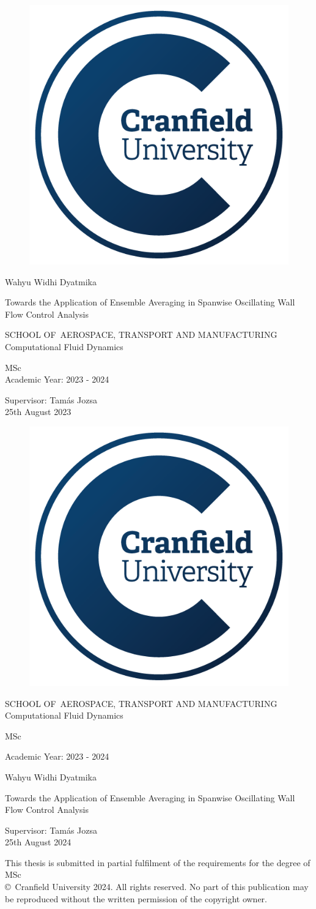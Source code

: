 {  \makeatletter
    \centering\Large\singlespacing%
    \pagestyle{empty}%
    \begin{figure}[H]
    \centering
    \includegraphics[width=0.3\linewidth]{Figures/CULogo.png}
    \label{fig:lOGO}
\end{figure}

    \par
    Wahyu Widhi Dyatmika\par
    \vfill
    Towards the Application of  Ensemble Averaging in Spanwise Oscillating Wall Flow Control Analysis\par
    \vfill%
    SCHOOL OF~\MakeUppercase{AEROSPACE, TRANSPORT AND
MANUFACTURING}\\%
    Computational Fluid Dynamics\par%
    \vfill
    MSc\\
     Academic Year: 2023 - 2024\par
   \vfill
   Supervisor: Tamás Jozsa\\%
   25th August 2023\par
    \vfill\null\cleardoublepage
    \centering\Large%
    \pagestyle{empty}
    \begin{figure}[H]
    \centering
    \includegraphics[width=0.3\linewidth]{Figures/CULogo.png}
    \label{fig:culogo}
\end{figure}
\par
    \vfill%
    SCHOOL OF~\MakeUppercase{AEROSPACE, TRANSPORT AND
MANUFACTURING}\\%
    Computational Fluid Dynamics\par%
    \vfill
    MSc\par%
    \vfill
    Academic Year: 2023 - 2024\par%
    \vfill
    Wahyu Widhi Dyatmika\par
    \vfill
    Towards the Application of  Ensemble Averaging in Spanwise Oscillating Wall Flow Control Analysis\par
    \vfill
    Supervisor: Tamás Jozsa\\
     25th August 2024\par
     \vfill
     This thesis is submitted in partial fulfilment of the requirements for the degree of MSc\\%
     \vfill
     \copyright\ Cranfield University 2024. All rights reserved.
    No part of this publication may be reproduced without the written
     permission of the copyright owner.
    \cleardoublepage
    \makeatother
}
